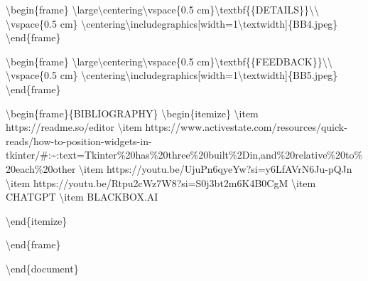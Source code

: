 \textbackslash begin\{frame\}
\textbackslash large\textbackslash centering\textbackslash vspace\{0.5
cm\}\textbackslash textbf\{\{DETAILS\}\}\textbackslash\textbackslash{}
\textbackslash vspace\{0.5 cm\}
\textbackslash centering\textbackslash includegraphics{[}width=1\textbackslash textwidth{]}\{BB4.jpeg\}
\textbackslash end\{frame\}

\textbackslash begin\{frame\}
\textbackslash large\textbackslash centering\textbackslash vspace\{0.5
cm\}\textbackslash textbf\{\{FEEDBACK\}\}\textbackslash\textbackslash{}
\textbackslash vspace\{0.5 cm\}
\textbackslash centering\textbackslash includegraphics{[}width=1\textbackslash textwidth{]}\{BB5.jpeg\}
\textbackslash end\{frame\}

\textbackslash begin\{frame\}\{BIBLIOGRAPHY\}
\textbackslash begin\{itemize\} \textbackslash item
https://readme.so/editor \textbackslash item
https://www.activestate.com/resources/quick-reads/how-to-position-widgets-in-tkinter/\#:\textasciitilde:text=Tkinter\%20has\%20three\%20built\%2Din,and\%20relative\%20to\%20each\%20other
\textbackslash item https://youtu.be/UjuPn6qyeYw?si=y6LfAVrN6Ju-pQJn
\textbackslash item https://youtu.be/Rtpu2cWz7W8?si=S0j3bt2m6K4B0CgM
\textbackslash item CHATGPT \textbackslash item BLACKBOX.AI

\textbackslash end\{itemize\}

\textbackslash end\{frame\}

\textbackslash end\{document\}
